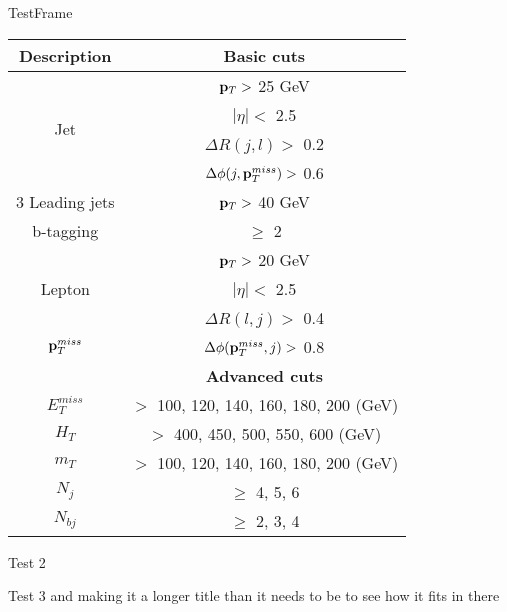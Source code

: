 \documentclass{beamer}
\begin{document}
\begin{frame}{TestFrame}

      \begin{tabular}{|c|c|} \hline
        Description & Basic cuts  \\ \hline
       \multirow{4}{*}{Jet} &${\bf p}_T >$ 25 GeV   \\
           &$|\eta| < $ 2.5   \\
           &$\Delta R(j,l) >$ 0.2  \\
           &$\Delta \phi(j,{\bf p}_T^{miss}) >$ 0.6  \\ \hline
        3 Leading jets & ${\bf p}_T >$ 40 GeV   \\ \hline
        b-tagging & $\ge$ 2 \\ \hline
        \multirow{3}{*}{Lepton} & ${\bf p}_T >$ 20 GeV \\
               & $|\eta| <$ 2.5 \\
               & $\Delta R(l,j) >$ 0.4 \\ \hline
        {${\bf p}_T^{miss}$} & $\Delta \phi({\bf p}_T^{miss},j) >$ 0.8 \\ \hline
        & {\bf Advanced cuts} \\ \hline
        $E_T^{miss}$ & $>$ 100, 120, 140, 160, 180, 200 (GeV)\\ \hline
        $H_T$ & $>$ 400, 450, 500, 550, 600 (GeV)\\ \hline
        $m_T$ & $>$ 100, 120, 140, 160, 180, 200 (GeV)\\ \hline
        $N_j$ & $\ge$ 4, 5, 6 \\ \hline
        $N_{bj}$ & $\ge$ 2, 3, 4 \\ \hline
      \end{tabular}

\end{frame}

\begin{frame}{Test 2}
\scalebox{.65}{}
\end{frame}

\begin{frame}{Test 3 and making it a longer title than it needs to be to see how it fits in there}
\begin{center}
\scalebox{.45}{}
\end{center}
\end{frame}
\end{document}
